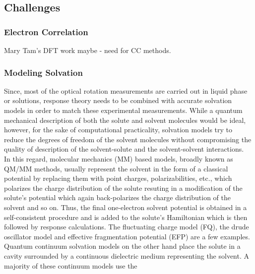 \subsection{Challenges}
\subsubsection{Electron Correlation}
Mary Tam's DFT work maybe - need for CC methods.
\subsubsection{Modeling Solvation}
Since, most of the optical rotation measurements are carried out in liquid phase or solutions,
response theory needs to be combined with accurate solvation models in order to match these
experimental measurements. While a quantum mechanical description of both the solute and solvent molecules would be ideal, 
however, for the sake of computational practicality, solvation models try to reduce the degrees of freedom of
the solvent molecules without compromising the quality of description of the solvent-solute and the solvent-solvent
interactions.\\
In this regard, molecular mechanics (MM) based models, broadly known as QM/MM methods, usually represent the
solvent in the form of a classical potential by replacing them with point charges, polarizabilities, etc.,\cite{}
which polarizes the charge distribution of the solute resuting in a modification of the solute's potential which
again back-polarizes the charge distribution of the solvent and so on. Thus, the final one-electron solvent potential is obtained in a
self-consistent procedure and is added to the solute's Hamiltonian which is then followed by response calculations. The fluctuating
charge model (FQ)\cite{}, the drude oscillator model\cite{} and effective fragmentation potential (EFP)\cite{} are a few 
examples.\\
Quantum continuum solvation models on the other hand place the solute in a cavity surrounded by a continuous
dielectric medium representing the solvent. A majority of these continuum models use the

